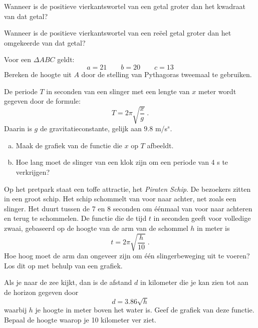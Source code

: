 \documentclass[12pt,twoside]{article}
\begin{document}
\begin{oefening} %
Wanneer is de positieve vierkantswortel van een getal groter dan het kwadraat van dat getal?
\end{oefening}

\begin{oefening} %
Wanneer is de positieve vierkantswortel van een reëel getal groter dan het omgekeerde van dat getal?
\end{oefening}


\begin{oefening} %
Voor een $\Delta ABC$ geldt:
$$a=21\qquad b=20\qquad c=13$$
Bereken de hoogte uit $A$ door de stelling van Pythagoras tweemaal te gebruiken.
\end{oefening}

\begin{oefening} %
De periode $T$ in seconden van een slinger met een lengte van $x$ meter wordt gegeven door de formule:
$$T=2\pi\sqrt{\dfrac{x}{g}}\;.$$
Daarin is $g$ de gravitatieconstante, gelijk aan $9.8$ m/s$^s$.
\begin{enumerate}[(a)]
  \item Maak de grafiek van de functie die $x$ op $T$ afbeeldt.
  \item Hoe lang moet de slinger van een klok zijn om een periode van 4 s te verkrijgen?
\end{enumerate}
\end{oefening}

\begin{oefening} %
Op het pretpark staat een toffe attractie, het {\em Piraten Schip}. De bezoekers zitten in een groot schip. Het schip schommelt van voor naar achter, net zoals een slinger. Het duurt tussen de 7 en 8 seconden om éénmaal van voor naar achteren en terug te schommelen. De functie die de tijd $t$ in seconden geeft voor volledige zwaai, gebaseerd op de hoogte van de arm van de schommel $h$ in meter is
$$t=2\pi\sqrt{\dfrac{h}{10}}\;.$$
Hoe hoog moet de arm dan ongeveer zijn om één slingerbeweging uit te voeren? Los dit op met behulp van een grafiek.
\end{oefening}

\begin{oefening} %
Als je naar de zee kijkt, dan is de afstand $d$ in kilometer die je kan zien tot aan de horizon gegeven door
$$d=3.86\sqrt{h}$$
waarbij $h$ je hoogte in meter boven het water is. Geef de grafiek van deze functie. Bepaal de hoogte waarop je 10 kilometer ver ziet.
\end{oefening}
\end{document}
